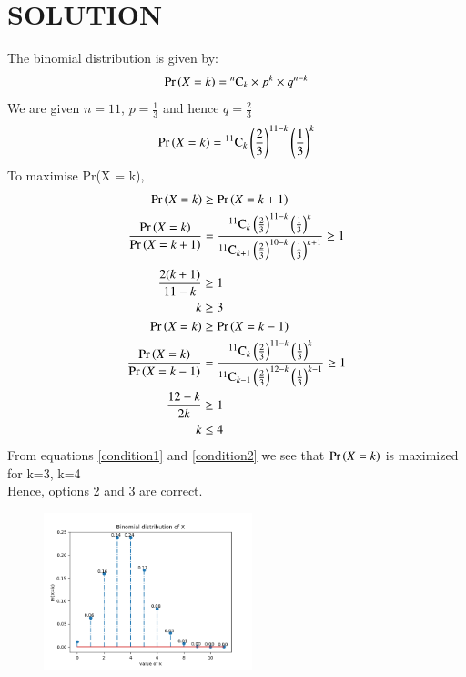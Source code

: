 \documentclass[journal,12pt,twocolumn]{IEEEtran}
\begin{document}
\section{\textbf{SOLUTION}}
The binomial distribution is given by:
\begin{equation}
\Pr\left(X=k\right)={}^{n}\mathrm{C}_{k}\times p^k\times q^{n-k}
\end{equation}
We are given $n=11$, $p=\frac{1}{3}$ and hence $q=\frac{2}{3}$
\begin{align}
\Pr\left(X = k\right)={{}^{11}\mathrm{C}_{k}}\left(\frac{2}{3}\right)^{11-k}\left(\frac{1}{3}\right)^{k}
\end{align}
To maximise Pr(X = k),
\begin{align}
\Pr\left(X = k\right)&\geq\Pr\left(X = k+1\right)\\
\frac{\Pr\left(X = k\right)}{\Pr\left(X = k+1\right)}&=\frac{{{}^{11}\mathrm{C}_{k}}\left(\frac{2}{3}\right)^{11-k}\left(\frac{1}{3}\right)^{k}}{{{}^{11}\mathrm{C}_{k+1}}\left(\frac{2}{3}\right)^{10-k}\left(\frac{1}{3}\right)^{k+1}}\geq1
\end{align}
\begin{align}
\frac{2(k+1)}{11-k}&\geq1\\
k&\geq3\label{condition1}\\
\Pr\left(X = k\right)&\geq\Pr\left(X = k-1\right)\\
\frac{\Pr\left(X = k\right)}{\Pr\left(X = k-1\right)}&=\frac{{{}^{11}\mathrm{C}_{k}}\left(\frac{2}{3}\right)^{11-k}\left(\frac{1}{3}\right)^{k}}{{{}^{11}\mathrm{C}_{k-1}}\left(\frac{2}{3}\right)^{12-k}\left(\frac{1}{3}\right)^{k-1}}\geq1\\
\frac{12-k}{2k}&\geq1\\
k&\leq4\label{condition2}
\end{align}
From equations \eqref{condition1} and \eqref{condition2} we see that $\Pr\left(X = k\right)$ is maximized for k=3, k=4\\
Hence, options 2 and 3 are correct.\\
\begin{figure}[!htb]
\centering
\includegraphics[width =0.54\textwidth]{Binomial-stemplot.png}
\end{figure}
\end{document}
